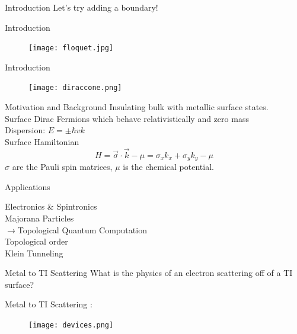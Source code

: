 \documentclass[]{beamer}
\begin{document}
\begin{frame}{Introduction}
\center
Let's try adding a boundary!
\end{frame}  

\begin{frame}{Introduction}
\begin{figure}
\center
\texttt{[image: floquet.jpg]}

\end{figure}
\end{frame} 


\begin{frame}{Introduction}
\begin{figure}
\center
\texttt{[image: diraccone.png]}

\end{figure}
\end{frame}  


\begin{frame}{Motivation and Background}
Insulating bulk with metallic surface states.\\
Surface Dirac Fermions which behave relativistically and zero mass\\
Dispersion: $E=\pm\hbar v k$ \\

Surface Hamiltonian
\begin{equation*}
H=\vec{\sigma}\cdot \vec{k}-\mu=\sigma_x k_x + \sigma_y k_y - \mu
\end{equation*}
$\sigma$ are the Pauli spin matrices, $\mu$ is the chemical potential.
\end{frame}

\begin{frame}{Applications}

Electronics \& Spintronics\\
Majorana Particles\\
$\rightarrow$Topological Quantum Computation\\
Topological order\\
Klein Tunneling\\
\end{frame}


\begin{frame}{Metal to TI Scattering}
\Large What is the physics of an electron scattering off of a TI surface?
\end{frame}


\begin{frame}{Metal to TI Scattering :}
\begin{figure}
\center
\texttt{[image: devices.png]}
\end{figure}
\end{frame}
\end{document}
